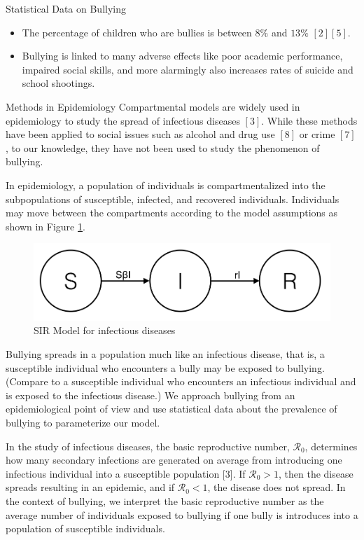 \documentclass[serif,mathserif,final]{beamer}
\begin{document}
\begin{frame}{}
\begin{columns}[t]
\begin{column}{0.23\linewidth}
\begin{block}{Statistical Data on Bullying}
\begin{itemize}
\item The percentage of children who are bullies is between $8\%$ and $13\%$ $[2][5]$.

\item Bullying is linked to many adverse effects like poor academic performance, impaired social skills, and more alarmingly also increases rates of suicide and school shootings. 

\end{itemize}
      \end{block}

      \begin{block}{Methods in Epidemiology} \small
       Compartmental models are widely used in epidemiology to study the spread of infectious diseases $[3]$. While these methods have been applied to social issues such as alcohol and drug use $[8]$ or crime $[7]$, to our knowledge, they have not been used to study the phenomenon of bullying.

In epidemiology, a population of individuals is compartmentalized into the subpopulations of susceptible, infected, and recovered individuals. Individuals may move between the compartments according to the model assumptions as shown in Figure \ref{fig:SIR}. 

\begin{figure}[H]
\centering
\includegraphics[width=.65\textwidth]{SIR}
\vspace{-10pt}
\caption{\label{fig:SIR} SIR Model for infectious diseases}
\end{figure}
Bullying spreads in a population much like an infectious disease, that is, a susceptible individual who encounters a bully may be exposed to bullying. (Compare to a susceptible individual who encounters an infectious individual and is exposed to the infectious disease.) We approach bullying from an epidemiological point of view and use statistical data about the prevalence of bullying to parameterize our model.

In the study of infectious diseases, the basic reproductive number, $\mathscr{R}_0$, determines how many secondary infections are generated on average from introducing one infectious individual into a susceptible population [3]. If $\mathscr{R}_0>1$, then the disease spreads resulting in an epidemic, and if $\mathscr{R}_0<1$, the disease does not spread. In the context of bullying, we interpret the basic reproductive number as the average number of individuals exposed to bullying if one bully is introduces into a population of susceptible individuals. 
      \end{block}


\end{column}
\end{columns}
\end{frame}
\end{document}
